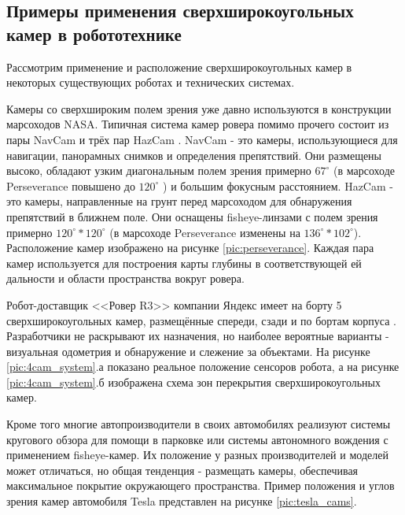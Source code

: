 \subsection{Примеры применения сверхширокоугольных камер в робототехнике }

Рассмотрим применение и расположение сверхширокоугольных камер в некоторых существующих роботах и 
технических системах.

Камеры со сверхшироким полем зрения уже давно используются в конструкции марсоходов NASA. Типичная система 
камер ровера помимо прочего состоит из пары NavCam и трёх пар HazCam \cite{opportunity}. NavCam - это камеры, использующиеся для навигации,
 панорамных снимков и определения препятствий. Они размещены высоко, обладают узким диагональным полем зрения примерно $67^\circ$ (в марсоходе 
Perseverance повышено до $120^\circ$ \cite{perseverance}) и большим фокусным расстоянием. HazCam - это камеры, направленные на грунт перед марсоходом для обнаружения 
 препятствий в ближнем поле. Они оснащены fisheye-линзами с полем зрения примерно $120^\circ * 120^\circ$ (в марсоходе Perseverance изменены на $136^\circ * 102^\circ$).
Расположение камер изображено на рисунке \ref{pic:perseverance}. Каждая пара камер используется для построения карты глубины в соответствующей ей дальности 
и области пространства вокруг ровера. 


Робот-доставщик <<Ровер R3>>  компании Яндекс имеет на борту 5 сверхширокоугольных камер, 
размещённые спереди, сзади и по бортам корпуса \cite{yandex_rover}. Разработчики не раскрывают их назначения, но наиболее 
вероятные варианты - визуальная одометрия и обнаружение и слежение за объектами. %
На рисунке \ref{pic:4cam_system}.а показано реальное положение сенсоров робота, а на рисунке \ref{pic:4cam_system}.б 
изображена схема зон перекрытия сверхширокоугольных камер. 

 
Кроме того многие автопроизводители в своих автомобилях реализуют системы кругового обзора для помощи в парковке или 
системы автономного вождения с применением fisheye-камер. Их положение у разных производителей и моделей может отличаться, 
но общая тенденция - размещать камеры, обеспечивая максимальное покрытие окружающего пространства. Пример положения и 
углов зрения камер автомобиля Tesla представлен на рисунке \ref{pic:tesla_cams}. 

